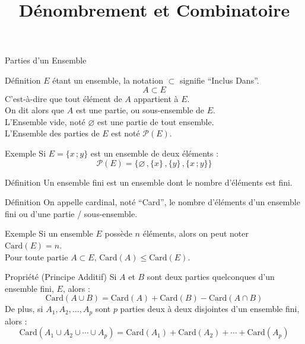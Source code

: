 \documentclass{cours}
\begin{document}
    \title{Dénombrement et Combinatoire}

    \begin{Gpartie}{Parties d'un Ensemble}
        \begin{Spartie}{Définition}
            $E$ étant un ensemble, la notation $\subset$ signifie ``Inclus Dans''.
            \[A\subset E\]
            C'est-à-dire que tout élément de $A$ appartient à $E$. \\
            On dit alors que $A$ est une partie, ou sous-ensemble de $E$. \\
            L'Ensemble vide, noté $\varnothing$ est une partie de tout ensemble. \\
            L'Ensemble des parties de $E$ est noté $\mathcal{P}(E)$.
            \begin{SSpartie}{Exemple}
                Si $E=\big\{x\,;y\big\}$ est un ensemble de deux éléments :
                \[\mathcal{P}(E)=\Big\{\varnothing\,,\big\{x\big\}\,,\big\{y\big\}\,,\big\{x\,;y\big\}\Big\}\]
            \end{SSpartie}
        \end{Spartie}
        \begin{Spartie}{Définition}
            Un ensemble fini est un ensemble dont le nombre d'éléments est fini.
        \end{Spartie}
        \begin{Spartie}{Définition}
            On appelle cardinal, noté ``Card'', le nombre d'éléments d'un ensemble fini ou d'une partie / sous-ensemble.
            \begin{SSpartie}{Exemple}
                Si un ensemble $E$ possède $n$ éléments, alors on peut noter $\text{Card}(E)=n$. \\
                Pour toute partie $A\subset E$, $\text{Card}(A)\leq\text{Card}(E)$.
            \end{SSpartie}
        \end{Spartie}
        \begin{Spartie}{Propriété (Principe Additif)}
            Si $A$ et $B$ sont deux parties quelconques d'un ensemble fini, $E$, alors :
            \[\text{Card}(A\cup B)=\text{Card}(A)+\text{Card}(B)-\text{Card}(A\cap B)\]
            De plus, si $A_1, A_2,\dotsc, A_p$ sont $p$ parties deux à deux disjointes d'un ensemble fini, alors :
            \[\text{Card}(A_1\cup A_2\cup\dotsb\cup A_p)=\text{Card}(A_1)+\text{Card}(A_2)+\dotsb+\text{Card}(A_p)\]

\end{Spartie}
\end{Gpartie}
\end{document}
